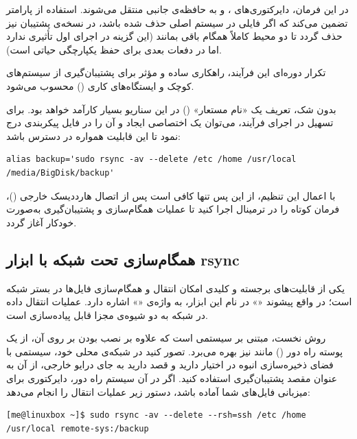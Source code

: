 در این فرمان، دایرکتوری‌های ،  و  به حافظه‌ی جانبی منتقل می‌شوند. استفاده از پارامتر  تضمین می‌کند که اگر فایلی در سیستم اصلی حذف شده باشد، در نسخه‌ی پشتیبان نیز حذف گردد تا دو محیط کاملاً همگام باقی بمانند (این گزینه در اجرای اول تأثیری ندارد اما در دفعات بعدی برای حفظ یکپارچگی حیاتی است).

تکرار دوره‌ای این فرآیند، راهکاری ساده و مؤثر برای پشتیبان‌گیری از سیستم‌های کوچک و ایستگاه‌های کاری () محسوب می‌شود.

بدون شک، تعریف یک «نام مستعار» () در این سناریو بسیار کارآمد خواهد بود. برای تسهیل در اجرای فرآیند، می‌توان یک  اختصاصی ایجاد و آن را در فایل پیکربندی  درج نمود تا این قابلیت همواره در دسترس باشد:

\begin{latin}
\begin{lstlisting}
alias backup='sudo rsync -av --delete /etc /home /usr/local /media/BigDisk/backup'
\end{lstlisting}
\end{latin}

با اعمال این تنظیم، از این پس تنها کافی است پس از اتصال هارددیسک خارجی ()، فرمان کوتاه  را در ترمینال اجرا کنید تا عملیات همگام‌سازی و پشتیبان‌گیری به‌صورت خودکار آغاز گردد.

\subsection{همگام‌سازی تحت شبکه با ابزار rsync}

یکی از قابلیت‌های برجسته و کلیدی  امکان انتقال و همگام‌سازی فایل‌ها در بستر شبکه است؛ در واقع پیشوند «» در نام این ابزار، به واژه‌ی «» اشاره دارد. عملیات انتقال داده در شبکه به دو شیوه‌ی مجزا قابل پیاده‌سازی است.

روش نخست، مبتنی بر سیستمی است که علاوه بر نصب بودن  بر روی آن، از یک پوسته راه دور () مانند  نیز بهره می‌برد. تصور کنید در شبکه‌ی محلی خود، سیستمی با فضای ذخیره‌سازی انبوه در اختیار دارید و قصد دارید به جای درایو خارجی، از آن به عنوان مقصد پشتیبان‌گیری استفاده کنید. اگر در آن سیستم راه دور، دایرکتوری  برای میزبانی فایل‌های شما آماده باشد، دستور زیر عملیات انتقال را انجام می‌دهد:

\begin{latin}
\begin{lstlisting}
[me@linuxbox ~]$ sudo rsync -av --delete --rsh=ssh /etc /home /usr/local remote-sys:/backup
\end{lstlisting}
\end{latin}

